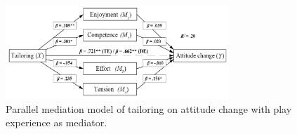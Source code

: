 \documentclass[11pt]{article}
\begin{document}
\begin{figure}[H]
\centering
\includegraphics[width=0.75\textwidth]{img/orji2017-tailoring-mediation-results.png} 
\caption{Parallel mediation model of tailoring on attitude change with play experience as mediator.}\label{fig:orji2017-tailoring-mediation-results}
\end{figure}




\newpage
\small

\normalsize
\end{document}
